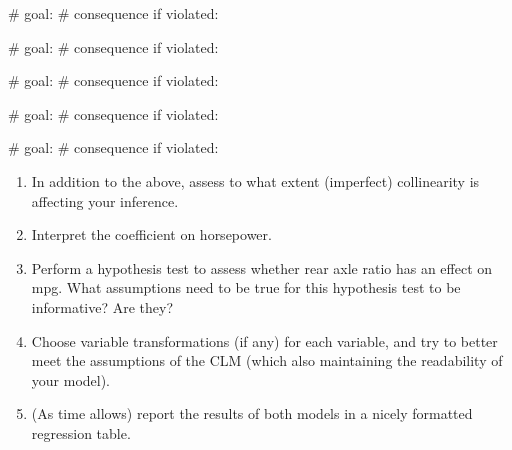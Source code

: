 \documentclass[
  letterpaper,
  DIV=11,
  numbers=noendperiod]{scrreprt}
\newenvironment{Shaded}{\begin{snugshade}}{\end{snugshade}}
\newcommand{\CommentTok}[1]{\textcolor[rgb]{0.37,0.37,0.37}{#1}}
\begin{document}
\begin{Shaded}
\begin{Highlighting}[]
\CommentTok{\# goal:}
\CommentTok{\# consequence if violated:}
\end{Highlighting}
\end{Shaded}

\begin{Shaded}
\begin{Highlighting}[]
\CommentTok{\# goal:}
\CommentTok{\# consequence if violated:}
\end{Highlighting}
\end{Shaded}

\begin{Shaded}
\begin{Highlighting}[]
\CommentTok{\# goal:}
\CommentTok{\# consequence if violated:}
\end{Highlighting}
\end{Shaded}

\begin{Shaded}
\begin{Highlighting}[]
\CommentTok{\# goal:}
\CommentTok{\# consequence if violated:}
\end{Highlighting}
\end{Shaded}

\begin{Shaded}
\begin{Highlighting}[]
\CommentTok{\# goal:}
\CommentTok{\# consequence if violated:}
\end{Highlighting}
\end{Shaded}

\begin{enumerate}
\def\labelenumi{\arabic{enumi}.}
\setcounter{enumi}{2}
\item
  In addition to the above, assess to what extent (imperfect)
  collinearity is affecting your inference.
\item
  Interpret the coefficient on horsepower.
\item
  Perform a hypothesis test to assess whether rear axle ratio has an
  effect on mpg. What assumptions need to be true for this hypothesis
  test to be informative? Are they?
\item
  Choose variable transformations (if any) for each variable, and try to
  better meet the assumptions of the CLM (which also maintaining the
  readability of your model).
\item
  (As time allows) report the results of both models in a nicely
  formatted regression table.
\end{enumerate}
\end{document}

